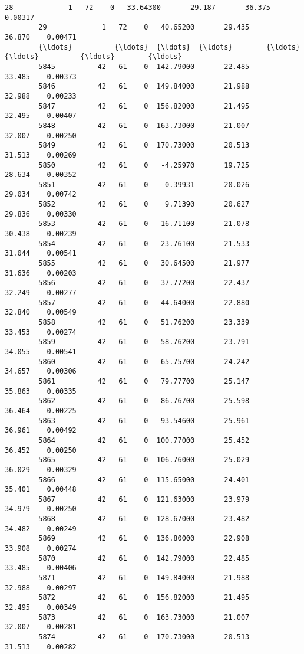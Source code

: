 \documentclass[11pt]{article}
\begin{document}
\begin{Verbatim}[commandchars=\\\{\}]
        28             1   72    0   33.64300       29.187       36.375    0.00317   
        29             1   72    0   40.65200       29.435       36.870    0.00471   
        {\ldots}          {\ldots}  {\ldots}  {\ldots}        {\ldots}          {\ldots}          {\ldots}        {\ldots}   
        5845          42   61    0  142.79000       22.485       33.485    0.00373   
        5846          42   61    0  149.84000       21.988       32.988    0.00233   
        5847          42   61    0  156.82000       21.495       32.495    0.00407   
        5848          42   61    0  163.73000       21.007       32.007    0.00250   
        5849          42   61    0  170.73000       20.513       31.513    0.00269   
        5850          42   61    0   -4.25970       19.725       28.634    0.00352   
        5851          42   61    0    0.39931       20.026       29.034    0.00742   
        5852          42   61    0    9.71390       20.627       29.836    0.00330   
        5853          42   61    0   16.71100       21.078       30.438    0.00239   
        5854          42   61    0   23.76100       21.533       31.044    0.00541   
        5855          42   61    0   30.64500       21.977       31.636    0.00203   
        5856          42   61    0   37.77200       22.437       32.249    0.00277   
        5857          42   61    0   44.64000       22.880       32.840    0.00549   
        5858          42   61    0   51.76200       23.339       33.453    0.00274   
        5859          42   61    0   58.76200       23.791       34.055    0.00541   
        5860          42   61    0   65.75700       24.242       34.657    0.00306   
        5861          42   61    0   79.77700       25.147       35.863    0.00335   
        5862          42   61    0   86.76700       25.598       36.464    0.00225   
        5863          42   61    0   93.54600       25.961       36.961    0.00492   
        5864          42   61    0  100.77000       25.452       36.452    0.00250   
        5865          42   61    0  106.76000       25.029       36.029    0.00329   
        5866          42   61    0  115.65000       24.401       35.401    0.00448   
        5867          42   61    0  121.63000       23.979       34.979    0.00250   
        5868          42   61    0  128.67000       23.482       34.482    0.00249   
        5869          42   61    0  136.80000       22.908       33.908    0.00274   
        5870          42   61    0  142.79000       22.485       33.485    0.00406   
        5871          42   61    0  149.84000       21.988       32.988    0.00297   
        5872          42   61    0  156.82000       21.495       32.495    0.00349   
        5873          42   61    0  163.73000       21.007       32.007    0.00281   
        5874          42   61    0  170.73000       20.513       31.513    0.00282   
        

\end{Verbatim}
\end{document}
